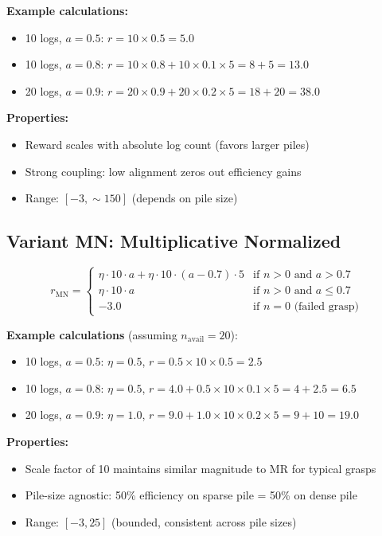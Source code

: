 \documentclass[11pt]{article}
\begin{document}
\textbf{Example calculations:}
\begin{itemize}
    \item 10 logs, $a=0.5$: $r = 10 \times 0.5 = 5.0$
    \item 10 logs, $a=0.8$: $r = 10 \times 0.8 + 10 \times 0.1 \times 5 = 8 + 5 = 13.0$
    \item 20 logs, $a=0.9$: $r = 20 \times 0.9 + 20 \times 0.2 \times 5 = 18 + 20 = 38.0$
\end{itemize}

\textbf{Properties:}
\begin{itemize}
    \item Reward scales with absolute log count (favors larger piles)
    \item Strong coupling: low alignment zeros out efficiency gains
    \item Range: $[-3, \sim 150]$ (depends on pile size)
\end{itemize}

\subsection{Variant MN: Multiplicative Normalized}

\begin{equation}
    r_{\text{MN}} = \begin{cases}
        \eta \cdot 10 \cdot a + \eta \cdot 10 \cdot (a - 0.7) \cdot 5 & \text{if } n > 0 \text{ and } a > 0.7 \\
        \eta \cdot 10 \cdot a & \text{if } n > 0 \text{ and } a \leq 0.7 \\
        -3.0 & \text{if } n = 0 \text{ (failed grasp)}
    \end{cases}
\end{equation}

\textbf{Example calculations} (assuming $n_{\text{avail}} = 20$):
\begin{itemize}
    \item 10 logs, $a=0.5$: $\eta=0.5$, $r = 0.5 \times 10 \times 0.5 = 2.5$
    \item 10 logs, $a=0.8$: $\eta=0.5$, $r = 4.0 + 0.5 \times 10 \times 0.1 \times 5 = 4 + 2.5 = 6.5$
    \item 20 logs, $a=0.9$: $\eta=1.0$, $r = 9.0 + 1.0 \times 10 \times 0.2 \times 5 = 9 + 10 = 19.0$
\end{itemize}

\textbf{Properties:}
\begin{itemize}
    \item Scale factor of 10 maintains similar magnitude to MR for typical grasps
    \item Pile-size agnostic: 50\% efficiency on sparse pile = 50\% on dense pile
    \item Range: $[-3, 25]$ (bounded, consistent across pile sizes)
\end{itemize}
\end{document}
